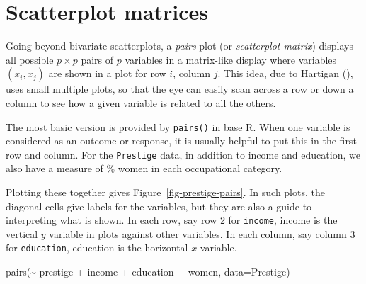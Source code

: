 \documentclass[
  letterpaper,
  10pt,
  krantz2]{krantz}
\makeatletter
\newenvironment{Shaded}{\begin{snugshade}}{\end{snugshade}}
\newcommand{\AttributeTok}[1]{\textcolor[rgb]{0.40,0.45,0.13}{#1}}
\newcommand{\FunctionTok}[1]{\textcolor[rgb]{0.28,0.35,0.67}{#1}}
\newcommand{\NormalTok}[1]{\textcolor[rgb]{0.00,0.23,0.31}{#1}}
\newcommand{\SpecialCharTok}[1]{\textcolor[rgb]{0.37,0.37,0.37}{#1}}
\newenvironment{kframe}{%
  \medskip{}
  \setlength{\fboxsep}{.8em}
  \def\at@end@of@kframe{}%
  \ifinner\ifhmode%
  \def\at@end@of@kframe{\end{minipage}}%
  \begin{minipage}{\columnwidth}%
  \fi\fi%
  \def\FrameCommand##1{\hskip\@totalleftmargin \hskip-\fboxsep
  \colorbox{shadecolor}{##1}\hskip-\fboxsep
      \hskip-\linewidth \hskip-\@totalleftmargin \hskip\columnwidth}%
  \MakeFramed {\advance\hsize-\width
    \@totalleftmargin\z@ \linewidth\hsize
    \@setminipage}}%
{\par\unskip\endMakeFramed%
  \at@end@of@kframe}
\renewenvironment{Shaded}{\begin{kframe}}{\end{kframe}}
\makeatother
\begin{document}
\section{Scatterplot matrices}\label{sec-scatmat}

Going beyond bivariate scatterplots, a \emph{pairs} plot (or
\emph{scatterplot matrix}) displays all possible \(p \times p\) pairs of
\(p\) variables in a matrix-like display where variables \((x_i, x_j)\)
are shown in a plot for row \(i\), column \(j\). This idea, due to
Hartigan (), uses small multiple
plots, so that the eye can easily scan across a row or down a column to
see how a given variable is related to all the others.

The most basic version is provided by \texttt{pairs()} in base R. When
one variable is considered as an outcome or response, it is usually
helpful to put this in the first row and column. For the
\texttt{Prestige} data, in addition to income and education, we also
have a measure of \% women in each occupational category.

Plotting these together gives Figure~\ref{fig-prestige-pairs}. In such
plots, the diagonal cells give labels for the variables, but they are
also a guide to interpreting what is shown. In each row, say row 2 for
\texttt{income}, income is the vertical \(y\) variable in plots against
other variables. In each column, say column 3 for \texttt{education},
education is the horizontal \(x\) variable.

\begin{Shaded}
\begin{Highlighting}[]
\FunctionTok{pairs}\NormalTok{(}\SpecialCharTok{\textasciitilde{}}\NormalTok{ prestige }\SpecialCharTok{+}\NormalTok{ income }\SpecialCharTok{+}\NormalTok{ education }\SpecialCharTok{+}\NormalTok{ women,}
      \AttributeTok{data=}\NormalTok{Prestige)}
\end{Highlighting}
\end{Shaded}
\end{document}
